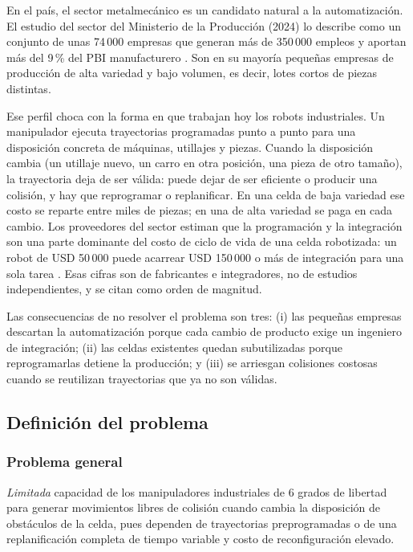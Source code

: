 \documentclass[11pt,a4paper,twoside]{article}
\begin{document}
En el país, el sector metalmecánico es un candidato natural a la automatización. El estudio del sector del Ministerio de la Producción (2024) lo describe como un conjunto de unas 74\,000 empresas que generan más de 350\,000 empleos y aportan más del 9\,\% del PBI manufacturero \cite{produce2025}. Son en su mayoría pequeñas empresas de producción de alta variedad y bajo volumen, es decir, lotes cortos de piezas distintas.

Ese perfil choca con la forma en que trabajan hoy los robots industriales. Un manipulador ejecuta trayectorias programadas punto a punto para una disposición concreta de máquinas, utillajes y piezas. Cuando la disposición cambia (un utillaje nuevo, un carro en otra posición, una pieza de otro tamaño), la trayectoria deja de ser válida: puede dejar de ser eficiente o producir una colisión, y hay que reprogramar o replanificar. En una celda de baja variedad ese costo se reparte entre miles de piezas; en una de alta variedad se paga en cada cambio. Los proveedores del sector estiman que la programación y la integración son una parte dominante del costo de ciclo de vida de una celda robotizada: un robot de USD 50\,000 puede acarrear USD 150\,000 o más de integración para una sola tarea \cite{fabricator}. Esas cifras son de fabricantes e integradores, no de estudios independientes, y se citan como orden de magnitud.

Las consecuencias de no resolver el problema son tres: (i) las pequeñas empresas descartan la automatización porque cada cambio de producto exige un ingeniero de integración; (ii) las celdas existentes quedan subutilizadas porque reprogramarlas detiene la producción; y (iii) se arriesgan colisiones costosas cuando se reutilizan trayectorias que ya no son válidas.

\subsection{Definición del problema}

\subsubsection{Problema general}

\emph{Limitada} capacidad de los manipuladores industriales de 6 grados de libertad para generar movimientos libres de colisión cuando cambia la disposición de obstáculos de la celda, pues dependen de trayectorias preprogramadas o de una replanificación completa de tiempo variable y costo de reconfiguración elevado.
\end{document}
